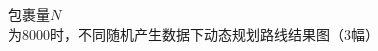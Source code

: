 \documentclass[twocolumn]{jbuaa}
\begin{document}
\begin{figure}[!h]
{\begin{minipage}{5cm}
		\end{minipage}}
		\caption{包裹量$N$为8000时，不同随机产生数据下动态规划路线结果图（3幅）} 
		\label{fig:4}                                          %

	\end{figure}
\end{document}
